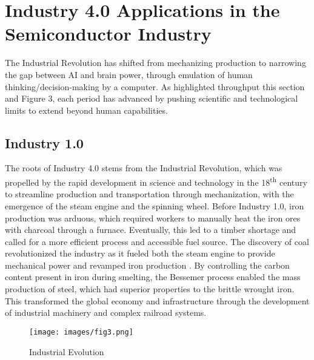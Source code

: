 \section{Industry 4.0 Applications in the Semiconductor Industry}\label{sec3:progression}
    The Industrial Revolution has shifted from mechanizing production to narrowing the gap between AI and brain power, through emulation of human thinking/decision-making by a computer. As highlighted throughput this section and Figure 3, each period has advanced by pushing scientific and technological limits to extend beyond human capabilities.
\subsection{Industry 1.0}\label{sec3_1:industry_1}
The roots of Industry 4.0 stems from the Industrial Revolution, which was propelled by the rapid development in science and technology in the 18\textsuperscript{th} century to streamline production and transportation through mechanization, with the emergence of the steam engine and the spinning wheel. Before Industry 1.0, iron production was arduous, which required workers to manually heat the iron ores with charcoal through a furnace. Eventually, this led to a timber shortage and called for a more efficient process and accessible fuel source. The discovery of coal revolutionized the industry as it fueled both the steam engine to provide mechanical power and revamped iron production \cite{industrial_rev}. By controlling the carbon content present in iron during smelting, the Bessemer process enabled the mass production of steel, which had superior properties to the brittle wrought iron. This transformed the global economy and infrastructure through the development of industrial machinery and complex railroad systems. 


\begin{figure}
    \texttt{[image: images/fig3.png]}
    \caption{Industrial Evolution}\label{fig:3}
\end{figure}

